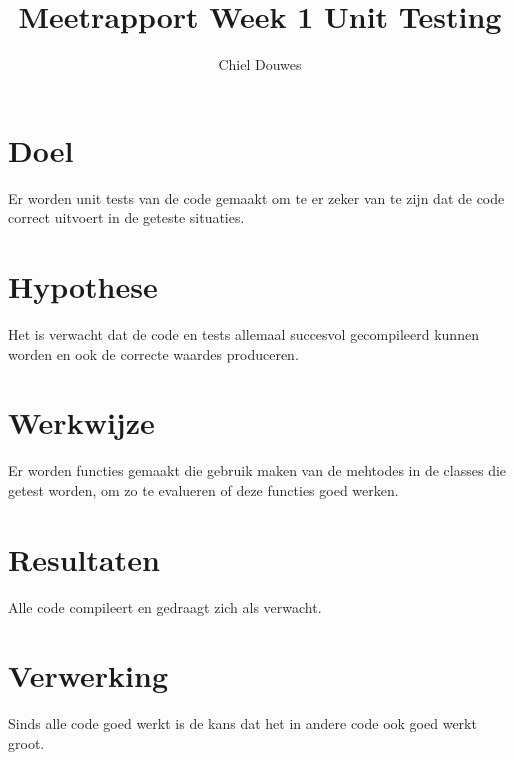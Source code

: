 \documentclass[11pt]{article}
\title{Meetrapport Week 1 Unit Testing}
\author{Chiel Douwes}
\begin{document}
    \maketitle


    \section{Doel}\label{sec:doel}
    Er worden unit tests van de code gemaakt om te er zeker van te zijn dat de code correct
    uitvoert in de geteste situaties.


    \section{Hypothese}\label{sec:hypothese}
    Het is verwacht dat de code en tests allemaal succesvol gecompileerd kunnen worden en ook de
    correcte waardes produceren.


    \section{Werkwijze}\label{sec:werkwijze}
    Er worden functies gemaakt die gebruik maken van de mehtodes in de classes die getest worden,
    om zo te evalueren of deze functies goed werken.


    \section{Resultaten}\label{sec:resultaten}
    Alle code compileert en gedraagt zich als verwacht.


    \section{Verwerking}\label{sec:verwerking}
    Sinds alle code goed werkt is de kans dat het in andere code ook goed werkt groot.
\end{document}
